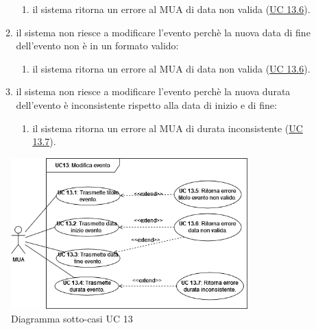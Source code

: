 \begin{itemize}
\begin{enumerate}[label=\alph*.]
            \begin{enumerate}[label=\arabic*.]
                \item il sistema ritorna un errore al MUA di data non valida (\hyperref[sec:UC13.6]{UC 13.6}).
            \end{enumerate}
            \item il sistema non riesce a modificare l'evento perchè la nuova data di fine dell'evento non è in un formato valido:
            \begin{enumerate}[label=\arabic*.]
                \item il sistema ritorna un errore al MUA di data non valida (\hyperref[sec:UC13.6]{UC 13.6}).
            \end{enumerate}
            \item il sistema non riesce a modificare l'evento perchè la nuova durata dell'evento è inconsistente rispetto alla data di inizio e di fine:
            \begin{enumerate}[label=\arabic*.]
                \item il sistema ritorna un errore al MUA di durata inconsistente (\hyperref[sec:UC13.7]{UC 13.7}).
            \end{enumerate}
        \end{enumerate}
    \end{itemize}

\begin{figure}[H]
    \includegraphics[width=0.813\textwidth]{sections/uc_imgs/UC13.png}
    \centering
    \caption{Diagramma sotto-casi UC 13}
\end{figure}

